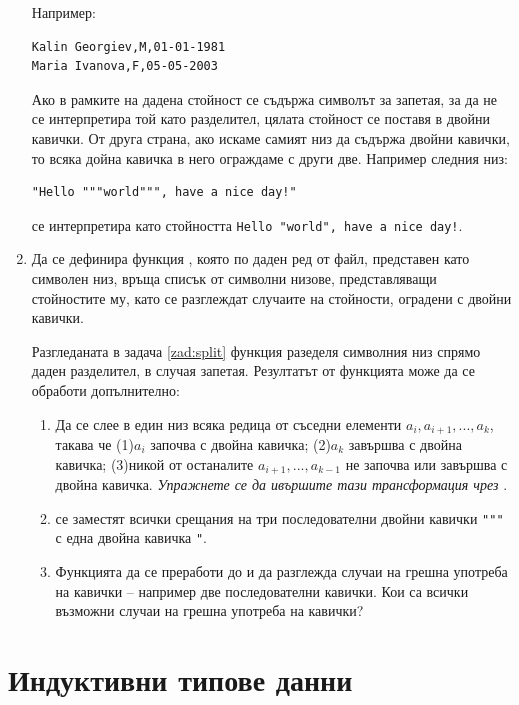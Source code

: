 \begin{enumerate}[resume]
\begin{mdframed}[hidealllines=true,backgroundcolor=gray!20]
Например:
\begin{verbatim}
Kalin Georgiev,M,01-01-1981
Maria Ivanova,F,05-05-2003
\end{verbatim}

Ако в рамките на дадена стойност се съдържа символът за запетая, за да не се интерпретира той като разделител, цялата стойност се поставя в двойни кавички. От друга страна, ако искаме самият низ да съдържа двойни кавички, то всяка дойна кавичка в него ограждаме с други две. Например следния низ:
\begin{verbatim}
"Hello """world""", have a nice day!"
\end{verbatim}
се интерпретира като стойността \verb#Hello "world", have a nice day!#.

\end{mdframed}

\item Да се дефинира функция , която по даден ред от  файл, представен като символен низ, връща списък от символни низове, представляващи стойностите му, като се разглеждат случаите на стойности, оградени с двойни кавички.

Разгледаната в задача \ref{zad:split} функция  разеделя символния низ спрямо даден разделител, в случая запетая. Резултатът от функцията може да се обработи допълнително:
\begin{enumerate}[label=\alph*)]
	\item Да се слее в един низ всяка редица от съседни елементи $a_i,a_{i+1},...,a_k$, такава че (1)$a_i$ започва с двойна кавичка;  (2)$a_k$ завършва с двойна кавичка; (3)никой от останалите $a_{i+1},...,a_{k-1}$ не започва или завършва с двойна кавичка. \emph{Упражнете се да ивършите тази трансформация чрез }.
	\item се заместят всички срещания на три последователни двойни кавички \verb#"""# с една двойна кавичка \verb#"#.
	\item Функцията да се преработи до  и да разглежда случаи на грешна употреба на кавички -- например две последователни кавички. Кои са всички възможни случаи на грешна употреба на кавички?
\end{enumerate}

\end{enumerate}


\section {Индуктивни типове данни}


